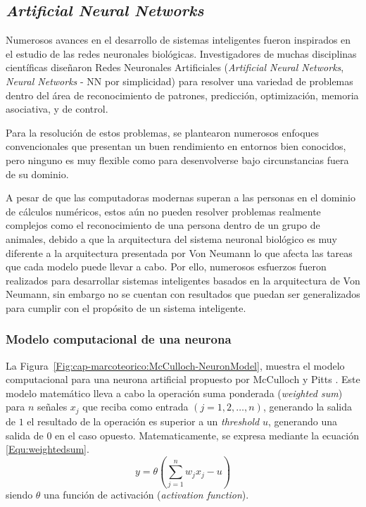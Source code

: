 \subsection{\textit{Artificial Neural Networks}}
Numerosos avances en el desarrollo de sistemas inteligentes fueron inspirados 
en el estudio de las redes neuronales biológicas. Investigadores de muchas 
disciplinas científicas diseñaron Redes Neuronales Artificiales 
(\textit{Artificial Neural Networks}, \textit{Neural Networks} - NN por 
simplicidad) para resolver una variedad de problemas dentro del área de 
reconocimiento de patrones, predicción, optimización, memoria asociativa, y de
control.

Para la resolución de estos problemas, se plantearon numerosos enfoques 
convencionales que presentan un buen rendimiento en entornos bien conocidos, 
pero ninguno es muy flexible como para desenvolverse bajo circunstancias fuera
de su dominio.

A pesar de que las computadoras modernas superan a las personas en el dominio
de cálculos numéricos, estos aún no pueden resolver problemas realmente 
complejos como el reconocimiento de una persona dentro de un grupo de 
animales, debido a que la arquitectura del sistema neuronal biológico es muy
diferente a la arquitectura presentada por Von Neumann lo que afecta las 
tareas que cada modelo puede llevar a cabo. Por ello, numerosos esfuerzos 
fueron realizados para desarrollar sistemas inteligentes basados en la 
arquitectura de Von Neumann, sin embargo no se cuentan con resultados que 
puedan ser generalizados para cumplir con el propósito de un sistema
inteligente.

\subsubsection{Modelo computacional de una neurona}
La Figura~\ref{Fig:cap-marcoteorico:McCulloch-NeuronModel}, muestra el modelo
computacional para una neurona artificial propuesto por McCulloch y Pitts
\cite{McCulloch:1943:TBofMB}. Este modelo matemático lleva a cabo la operación 
suma ponderada (\textit{weighted sum}) para $n$ señales $x_j$ que reciba como 
entrada $(j = 1, 2, \dots, n)$, generando la salida de $1$ el resultado de la
operación es superior a un \textit{threshold} $u$, generando una salida de $0$ 
en el caso opuesto. Matematicamente, se expresa mediante la ecuación 
\ref{Equ:weightedsum}.
\begin{equation}
	y = \theta \left( \sum_{j=1}^{n}{w_j x_j - u} \right)
	\label{Equ:weightedsum}
\end{equation}
siendo $\theta$ una función de activación (\textit{activation function}).

